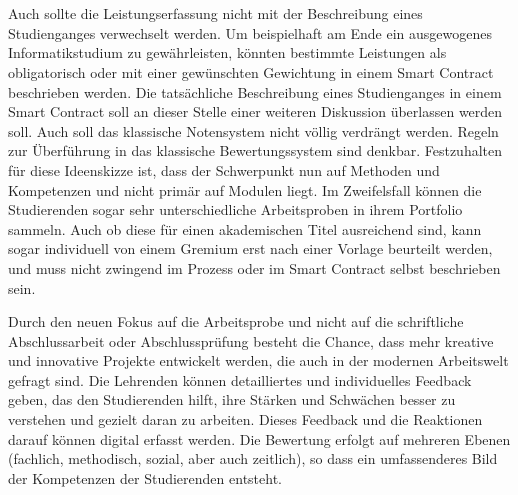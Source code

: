 \documentclass[conference]{IEEEtran}
\begin{document}
\\\\
Auch sollte die Leistungserfassung nicht mit der Beschreibung eines Studienganges verwechselt werden. Um beispielhaft am Ende ein ausgewogenes Informatikstudium zu gewährleisten, könnten bestimmte Leistungen als obligatorisch oder mit einer gewünschten Gewichtung in einem Smart Contract beschrieben werden. Die tatsächliche Beschreibung eines Studienganges in einem Smart Contract soll an dieser Stelle einer weiteren Diskussion überlassen werden soll. Auch soll das klassische Notensystem nicht völlig verdrängt werden. Regeln zur Überführung in das klassische Bewertungssystem sind denkbar. Festzuhalten für diese Ideenskizze ist, dass der Schwerpunkt nun auf Methoden und Kompetenzen und nicht primär auf Modulen liegt. Im Zweifelsfall können die Studierenden sogar sehr unterschiedliche Arbeitsproben in ihrem Portfolio sammeln. Auch ob diese für einen akademischen Titel ausreichend sind, kann sogar individuell von einem Gremium erst nach einer Vorlage beurteilt werden, und muss nicht zwingend im Prozess oder im Smart Contract selbst beschrieben sein. 

Durch den neuen Fokus auf die Arbeitsprobe und nicht auf die schriftliche Abschlussarbeit oder Abschlussprüfung besteht die Chance, dass mehr kreative und innovative Projekte entwickelt werden, die auch in der modernen Arbeitswelt gefragt sind. Die Lehrenden können detailliertes und individuelles Feedback geben, das den Studierenden hilft, ihre Stärken und Schwächen besser zu verstehen und gezielt daran zu arbeiten. Dieses Feedback und die Reaktionen darauf können digital erfasst werden. Die Bewertung erfolgt auf mehreren Ebenen (fachlich, methodisch, sozial, aber auch zeitlich), so dass ein umfassenderes Bild der Kompetenzen der Studierenden entsteht.
\end{document}
